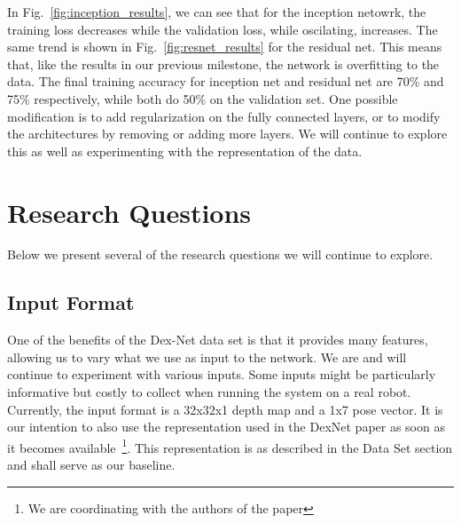 \documentclass[letterpaper, 10 pt, conference]{../ieeeconf}
\newcommand{\figref}[1]{Fig.~\ref{#1}} %
\begin{document}
In \figref{fig:inception_results}, we can see that for the inception netowrk, the training loss decreases while the validation loss, while oscilating, increases. 
The same trend is shown in \figref{fig:resnet_results} for the residual net. 
This means that, like the results in our previous milestone, the network is overfitting to the data. 
The final training accuracy for inception net and residual net are 70\% and 75\% respectively, while both do 50\% on the validation set. 
One possible modification is to add regularization on the fully connected layers, or to modify the architectures by removing or adding more layers. 
We will continue to explore this as well as experimenting with the representation of the data.

    

\section{Research Questions}
\label{sec:questions}
Below we present several of the research questions we will continue to explore. 

\subsection{Input Format}
One of the benefits of the Dex-Net data set is that it provides many features, allowing us to vary what we use as input to the network. 
We are and will continue to experiment with various inputs. 
Some inputs might be particularly informative but costly to collect when running the system on a real robot. 
Currently, the input format is a 32x32x1 depth map and a 1x7 pose vector. 
It is our intention to also use the representation used in the DexNet paper as soon as it becomes available~\footnote{We are coordinating with the authors of the paper}.
This representation is as described in the Data Set section and shall serve as our baseline. 
\end{document}
